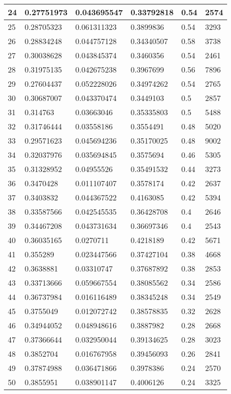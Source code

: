 \begin{longtable}{|l|l|l|l|l|l|}
24 & 0.27751973 & 0.043695547 & 0.33792818 & 0.54 & 2574 \\ \hline 
25 & 0.28705323 & 0.061311323 & 0.3899836 & 0.54 & 3293 \\ \hline 
26 & 0.28834248 & 0.044757128 & 0.34340507 & 0.58 & 3738 \\ \hline 
27 & 0.30038628 & 0.043845374 & 0.3460356 & 0.54 & 2461 \\ \hline 
28 & 0.31975135 & 0.042675238 & 0.3967699 & 0.56 & 7896 \\ \hline 
29 & 0.27604437 & 0.052228026 & 0.34974262 & 0.54 & 2765 \\ \hline 
30 & 0.30687007 & 0.043370474 & 0.3449103 & 0.5 & 2857 \\ \hline 
31 & 0.314763 & 0.03663046 & 0.35335803 & 0.5 & 5488 \\ \hline 
32 & 0.31746444 & 0.03558186 & 0.3554491 & 0.48 & 5020 \\ \hline 
33 & 0.29571623 & 0.045694236 & 0.35170025 & 0.48 & 9002 \\ \hline 
34 & 0.32037976 & 0.035694845 & 0.3575694 & 0.46 & 5305 \\ \hline 
35 & 0.31328952 & 0.04955526 & 0.35491532 & 0.44 & 3273 \\ \hline 
36 & 0.3470428 & 0.011107407 & 0.3578174 & 0.42 & 2637 \\ \hline 
37 & 0.3403832 & 0.044367522 & 0.4163085 & 0.42 & 5394 \\ \hline 
38 & 0.33587566 & 0.042545535 & 0.36428708 & 0.4 & 2646 \\ \hline 
39 & 0.34467208 & 0.043731634 & 0.36697346 & 0.4 & 2543 \\ \hline 
40 & 0.36035165 & 0.0270711 & 0.4218189 & 0.42 & 5671 \\ \hline 
41 & 0.355289 & 0.023447566 & 0.37427104 & 0.38 & 4668 \\ \hline 
42 & 0.3638881 & 0.03310747 & 0.37687892 & 0.38 & 2853 \\ \hline 
43 & 0.33713666 & 0.059667554 & 0.38085562 & 0.34 & 2586 \\ \hline 
44 & 0.36737984 & 0.016116489 & 0.38345248 & 0.34 & 2549 \\ \hline 
45 & 0.3755049 & 0.012072742 & 0.38578835 & 0.32 & 2628 \\ \hline 
46 & 0.34944052 & 0.048948616 & 0.3887982 & 0.28 & 2668 \\ \hline 
47 & 0.37366644 & 0.032950044 & 0.39134625 & 0.28 & 3023 \\ \hline 
48 & 0.3852704 & 0.016767958 & 0.39456093 & 0.26 & 2841 \\ \hline 
49 & 0.37874988 & 0.036471866 & 0.3978386 & 0.24 & 2570 \\ \hline 
50 & 0.3855951 & 0.038901147 & 0.4006126 & 0.24 & 3325 \\ \hline 
\end{longtable}